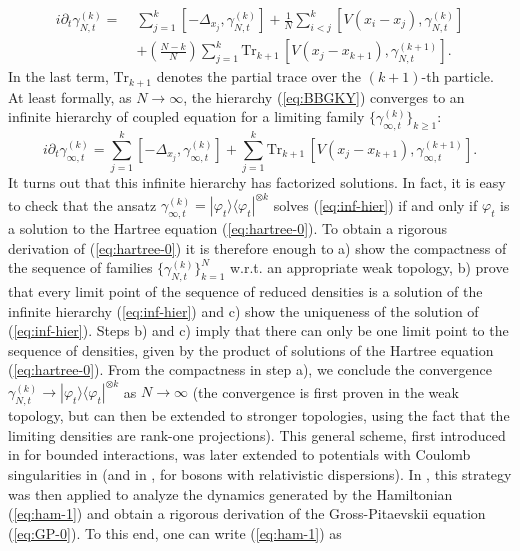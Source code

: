 \documentclass[11pt,a4paper]{article}
\newcommand{\tr}{\mbox{Tr}}
\begin{document}
\begin{equation}\label{eq:BBGKY} \begin{split}
i\partial_t \gamma^{(k)}_{N,t} = \; & \sum_{j=1}^k \left[-\Delta_{x_j} ,
\gamma^{(k)}_{N,t} \right]  + \frac{1}{N} \sum_{i<j}^k \left[ V(x_i - x_j) ,
\gamma^{(k)}_{N,t} \right] \\ &+\left( \frac{N-k}{N} \right) \sum_{j=1}^k
\tr_{k+1} \, \left[ V(x_j - x_{k+1}) , \gamma^{(k+1)}_{N,t} \right].
\end{split}\end{equation}
In the last term, $\tr_{k+1}$ denotes the partial trace over the $(k+1)$-th particle. At least formally, as $N \to \infty$, the hierarchy (\ref{eq:BBGKY}) converges to an infinite hierarchy of coupled equation for a limiting family $\{ \gamma_{\infty,t}^{(k)} \}_{k \geq 1}$:
\begin{equation}
\label{eq:inf-hier}
i\partial_t \gamma^{(k)}_{\infty,t} =  \sum_{j=1}^k \left[-\Delta_{x_j} , \gamma^{(k)}_{\infty,t} \right]  + \sum_{j=1}^k \tr_{k+1} \, \left[ V(x_j - x_{k+1}) , \gamma^{(k+1)}_{\infty,t} \right].
\end{equation}
It turns out that this infinite hierarchy has factorized solutions. In fact, it is easy to check that the ansatz $\gamma^{(k)}_{\infty,t} = |\varphi_t \rangle \langle \varphi_t|^{\otimes k}$ solves (\ref{eq:inf-hier}) if and only if $\varphi_t$ is a solution to the Hartree equation (\ref{eq:hartree-0}). To obtain a rigorous derivation of (\ref{eq:hartree-0}) it is therefore enough to a) show the compactness of the sequence of families $\{ \gamma_{N,t}^{(k)} \}_{k=1}^N$ w.r.t. an appropriate weak topology, b) prove that every limit point of the sequence of reduced densities is a solution of the infinite hierarchy (\ref{eq:inf-hier}) and c) show the uniqueness of the solution of (\ref{eq:inf-hier}). Steps b) and c) imply that there can only be one limit point to the sequence of densities, given by the product of solutions of the Hartree equation (\ref{eq:hartree-0}). From the compactness in step a), we conclude the convergence $\gamma^{(k)}_{N,t} \to |\varphi_t \rangle \langle \varphi_t|^{\otimes k}$ as $N \to \infty$ (the convergence is first proven in the weak topology, but can then be extended to stronger topologies, using the fact that the limiting densities are rank-one projections). This general scheme, first introduced in \cite{S} for bounded interactions, was later extended to potentials with Coulomb singularities in \cite{EY} (and in \cite{ES}, for bosons with relativistic dispersions). In \cite{ESY1,ESY2,ESY3,ESY4}, this strategy was then applied to analyze the dynamics generated by the Hamiltonian (\ref{eq:ham-1}) and obtain a rigorous derivation of the Gross-Pitaevskii equation (\ref{eq:GP-0}). To this end, one can write (\ref{eq:ham-1}) as
\end{document}
